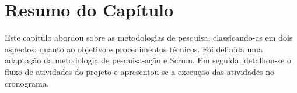   \section{Resumo do Capítulo}
  Este capítulo abordou sobre as metodologias de pesquisa, classicando-as em dois aspectos: quanto ao objetivo e procedimentos técnicos. Foi definida uma adaptação da metodologia de pesquisa-ação e Scrum. Em seguida, detalhou-se o fluxo de atividades do projeto e apresentou-se a execução das atividades no cronograma.